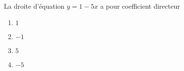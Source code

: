 
\begin{exercice}\label{exosmath-0390}

La droite d'équation \( y=1-5x\) a pour coefficient directeur
\begin{multicols}{3}
    \begin{enumerate}
        \item
            \( 1\)
        \item
            \( -1\)
        \item
            \( 5\)
        \item
            \( -5\)
    \end{enumerate}
\end{multicols}

\end{exercice}

